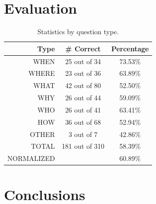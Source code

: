 \documentclass[11pt,letterpaper]{article}
\begin{document}

\section{Evaluation}
\label{sec:evaluation}


\begin{table}
\centering

	\begin{tabular}{|r|c|c|}
	\hline
	Type   & \# Correct & Percentage \\
	\hline
	\hline
	WHEN   &  25 out of  34 &  73.53\% \\
	\hline
	WHERE  &  23 out of  36 &  63.89\% \\
	\hline
	WHAT   &  42 out of  80 &  52.50\% \\
	\hline
	WHY    &  26 out of  44 &  59.09\% \\
	\hline
	WHO    &  26 out of  41 &  63.41\% \\
	\hline
	HOW    &  36 out of  68 &  52.94\% \\
	\hline
	OTHER  &   3 out of   7 &  42.86\% \\
	\hline
	\hline
	TOTAL  & 181 out of 310 &  58.39\% \\
	\tiny{NORMALIZED}  &  &  60.89\% \\
	\hline
	\end{tabular}

\caption{Statistics by question type.}
\label{table:question-types}
\end{table}

%
%




\section{Conclusions}
\label{sec:conclusion}
\end{document}
